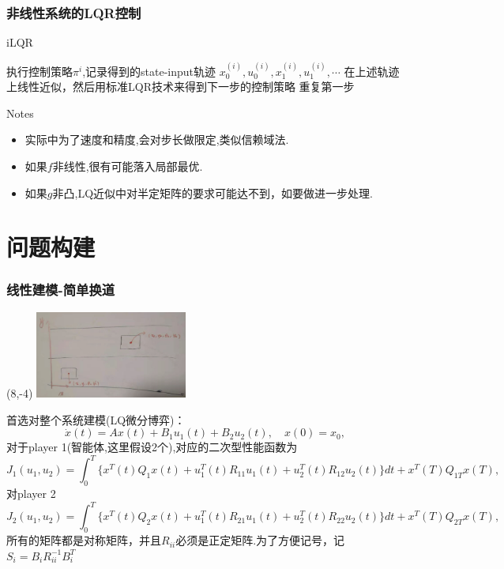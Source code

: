\documentclass[UTF8, aspectratio=169, 9pt]{ctexbeamer}
\begin{document}
\begin{frame}
\frametitle{非线性系统的LQR控制}
\begin{algorithm}[H]
\caption{iLQR}%
\LinesNumbered %
{
    执行控制策略$\pi^{i}$,记录得到的state-input轨迹 $x^ {(i)}_0,u^{(i)}_0,x^ {(i)}_1,u^{(i)}_1, \cdots $ \;
    在上述轨迹上线性近似，然后用标准LQR技术来得到下一步的控制策略 \;
    重复第一步 \;
    }
\end{algorithm}
Notes
\begin{itemize}
  \item 实际中为了速度和精度,会对步长做限定,类似信赖域法.
  \item 如果$f$非线性,很有可能落入局部最优.
  \item 如果$g$非凸,LQ近似中对半定矩阵的要求可能达不到，如要做进一步处理.
\end{itemize}
\end{frame}


\section{问题构建}
\begin{frame}
\frametitle{线性建模-简单换道}
\begin{textblock}{3}(8,-4)
    \includegraphics[width=5cm]{huandao.jpg}
\end{textblock}
  首选对整个系统建模(LQ微分博弈)：
  $$
  \dot{x}(t) = A x(t) + B_1 u_1(t) + B_2 u_2(t), \quad x(0) = x_0,
  $$
  对于player 1(智能体,这里假设2个),对应的二次型性能函数为
  $$
  J_1(u_1,u_2) = \int_{0}^{T} \{ x^T(t) Q_1 x(t) + u^T_1(t) R_{11} u_1(t) + u^T_2(t) R_{12} u_2(t)  \} dt + x^T(T) Q_{1T} x(T),
  $$
  对player 2
  $$
  J_2(u_1,u_2) = \int_{0}^{T} \{ x^T(t) Q_2 x(t) + u^T_1(t) R_{21} u_1(t) + u^T_2(t) R_{22} u_2(t)  \} dt + x^T(T) Q_{2T} x(T),
  $$
  所有的矩阵都是对称矩阵，并且$R_{ii}$必须是正定矩阵.为了方便记号，记$S_i=B_i R^{-1}_{ii} B^T_i$
\end{frame}
\end{document}
